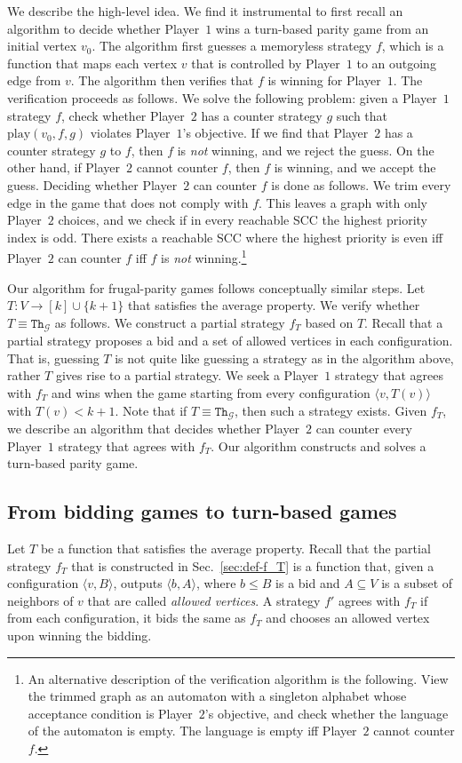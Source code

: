\documentclass{article}\providecommand{\nequiv}{\not\equiv}\usepackage[a4paper,margin=20mm]{geometry}
\newcommand{\PO}{Player~$1$\xspace}
\newcommand{\PT}{Player~$2$\xspace}
\newcommand{\G}{{\mathcal G}}
\newcommand{\thresh}{\texttt{Th}\xspace}
\newcommand{\play}{\text{play}\xspace}
\newcommand{\zug}[1]{\langle #1  \rangle}
\begin{document}
We describe the high-level idea. We find it instrumental to first recall an \NP algorithm to decide whether \PO wins a turn-based parity game from an initial vertex $v_0$. %
The algorithm first guesses a memoryless strategy $f$, which is a function that maps each vertex $v$ that is controlled by \PO to an outgoing edge from $v$. The algorithm then verifies that $f$ is winning for \PO. 
The verification proceeds as follows. We solve the following problem: given a \PO strategy $f$, check whether \PT has a counter strategy $g$ such that $\play(v_0, f, g)$ violates \PO's objective. If we find that \PT has a counter strategy $g$ to $f$, then $f$ is {\em not} winning, and we reject the guess. On the other hand, if \PT cannot counter $f$, then $f$ is winning, and we accept the guess. Deciding whether \PT can counter $f$ is done as follows. We trim every edge in the game that does not comply with $f$. This leaves a graph with only \PT choices, and we check if in every reachable SCC the highest priority index is odd. 
There exists a reachable SCC where the highest priority is even iff \PT can counter $f$ iff $f$ is {\em not} winning.\footnote{An alternative description of the verification algorithm is the following. View the trimmed graph as an automaton with a singleton alphabet whose acceptance condition is \PT's objective, and check whether the language of the automaton is empty. The language is empty iff \PT cannot counter $f$.} 


Our algorithm for frugal-parity games follows conceptually similar steps. Let \(T : V \rightarrow [k] \cup \{k+1\}\) that satisfies the average property. 
We verify whether \(T \equiv \thresh_\G\) as follows. We construct a partial strategy $f_T$ based on $T$. Recall that a partial strategy proposes a bid and a set of allowed vertices in each configuration. That is, guessing $T$ is not quite like guessing a strategy as in the algorithm above, rather $T$ gives rise to a partial strategy. 
We seek a \PO strategy that agrees with $f_T$ and wins when the game starting from every configuration $\zug{v, T(v)}$ with $T(v) < k+1$. 
Note that if $T \equiv \thresh_\G$, then such a strategy exists. 
Given $f_T$, we describe an algorithm that decides whether \PT can counter every \PO strategy that agrees with $f_T$. Our algorithm constructs and solves a turn-based parity game. 


\subsection{From bidding games to turn-based games}
Let  \(T\) be a function that satisfies the average property. Recall that the partial strategy \(f_T\) that is constructed in Sec.~\ref{sec:def-f_T} is a function that, given a configuration $\zug{v, B}$, outputs $\zug{b, A}$, where $b \leq B$ is a bid and $A \subseteq V$ is a subset of neighbors of $v$ that are called {\em allowed vertices}. A strategy $f'$ agrees with $f_T$ if from each configuration, it bids the same as $f_T$ and chooses an allowed vertex upon winning the bidding. 
\end{document}
